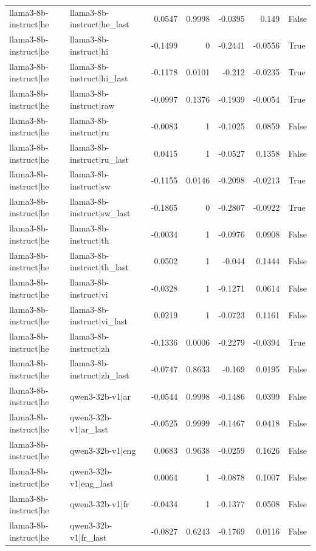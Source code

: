 \begin{table}
\begin{tabular}{l l r r r r l}
llama3-8b-instruct|he & llama3-8b-instruct|he_last & 0.0547 & 0.9998 & -0.0395 & 0.149 & False \\
llama3-8b-instruct|he & llama3-8b-instruct|hi & -0.1499 & 0 & -0.2441 & -0.0556 & True \\
llama3-8b-instruct|he & llama3-8b-instruct|hi_last & -0.1178 & 0.0101 & -0.212 & -0.0235 & True \\
llama3-8b-instruct|he & llama3-8b-instruct|raw & -0.0997 & 0.1376 & -0.1939 & -0.0054 & True \\
llama3-8b-instruct|he & llama3-8b-instruct|ru & -0.0083 & 1 & -0.1025 & 0.0859 & False \\
llama3-8b-instruct|he & llama3-8b-instruct|ru_last & 0.0415 & 1 & -0.0527 & 0.1358 & False \\
llama3-8b-instruct|he & llama3-8b-instruct|sw & -0.1155 & 0.0146 & -0.2098 & -0.0213 & True \\
llama3-8b-instruct|he & llama3-8b-instruct|sw_last & -0.1865 & 0 & -0.2807 & -0.0922 & True \\
llama3-8b-instruct|he & llama3-8b-instruct|th & -0.0034 & 1 & -0.0976 & 0.0908 & False \\
llama3-8b-instruct|he & llama3-8b-instruct|th_last & 0.0502 & 1 & -0.044 & 0.1444 & False \\
llama3-8b-instruct|he & llama3-8b-instruct|vi & -0.0328 & 1 & -0.1271 & 0.0614 & False \\
llama3-8b-instruct|he & llama3-8b-instruct|vi_last & 0.0219 & 1 & -0.0723 & 0.1161 & False \\
llama3-8b-instruct|he & llama3-8b-instruct|zh & -0.1336 & 0.0006 & -0.2279 & -0.0394 & True \\
llama3-8b-instruct|he & llama3-8b-instruct|zh_last & -0.0747 & 0.8633 & -0.169 & 0.0195 & False \\
llama3-8b-instruct|he & qwen3-32b-v1|ar & -0.0544 & 0.9998 & -0.1486 & 0.0399 & False \\
llama3-8b-instruct|he & qwen3-32b-v1|ar_last & -0.0525 & 0.9999 & -0.1467 & 0.0418 & False \\
llama3-8b-instruct|he & qwen3-32b-v1|eng & 0.0683 & 0.9638 & -0.0259 & 0.1626 & False \\
llama3-8b-instruct|he & qwen3-32b-v1|eng_last & 0.0064 & 1 & -0.0878 & 0.1007 & False \\
llama3-8b-instruct|he & qwen3-32b-v1|fr & -0.0434 & 1 & -0.1377 & 0.0508 & False \\
llama3-8b-instruct|he & qwen3-32b-v1|fr_last & -0.0827 & 0.6243 & -0.1769 & 0.0116 & False \\

\end{tabular}
\end{table}
